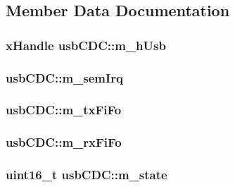 \subsection{Member Data Documentation}
\hypertarget{classusb_c_d_c_a8af7c1d1489eaa3fa35d140c1fb3e36b}{
\subsubsection[{m\-\_\-h\-Usb}]{\setlength{\rightskip}{0pt plus 5cm}x\-Handle usb\-C\-D\-C\-::m\-\_\-h\-Usb}}\label{classusb_c_d_c_a8af7c1d1489eaa3fa35d140c1fb3e36b}
\hypertarget{classusb_c_d_c_a9904020c60c4f19f92d12f539293dd1f}{
\subsubsection[{m\-\_\-sem\-Irq}]{ usb\-C\-D\-C\-::m\-\_\-sem\-Irq}}\label{classusb_c_d_c_a9904020c60c4f19f92d12f539293dd1f}
\hypertarget{classusb_c_d_c_acc8bfa27e6d3005950ccce1493de8f7b}{
\subsubsection[{m\-\_\-tx\-Fi\-Fo}]{ usb\-C\-D\-C\-::m\-\_\-tx\-Fi\-Fo}}\label{classusb_c_d_c_acc8bfa27e6d3005950ccce1493de8f7b}
\hypertarget{classusb_c_d_c_abded5563b5ed9b2b05773e2756b4b147}{
\subsubsection[{m\-\_\-rx\-Fi\-Fo}]{ usb\-C\-D\-C\-::m\-\_\-rx\-Fi\-Fo}}\label{classusb_c_d_c_abded5563b5ed9b2b05773e2756b4b147}
\hypertarget{classusb_c_d_c_ae4f03edf64316170547608292d2d4c0e}{
\subsubsection[{m\-\_\-state}]{\setlength{\rightskip}{0pt plus 5cm}uint16\-\_\-t usb\-C\-D\-C\-::m\-\_\-state}}\label{classusb_c_d_c_ae4f03edf64316170547608292d2d4c0e}

